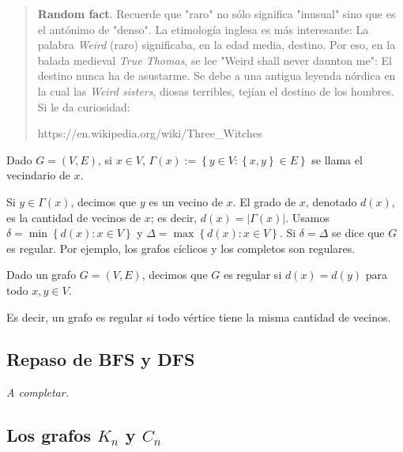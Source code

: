 \documentclass[a4paper]{article}
\begin{document}
\small
\begin{quote}

\textbf{Random fact}. Recuerde que "raro" no sólo significa "inusual" sino que es el
antónimo de "denso". La etimología inglesa es más interesante:
La palabra \textit{Weird} (raro) significaba, en la edad media, destino. Por
eso, en la balada medieval \textit{True Thomas}, se lee "Weird shall never
daunton me": El destino nunca ha de asustarme. Se debe a una antigua leyenda
nórdica en la cual las \textit{Weird sisters}, diosas terribles, tejían el
destino de los hombres. Si le da curiosidad:

https://en.wikipedia.org/wiki/Three_Witches

\end{quote}
\normalsize

\begin{definition}
    Dado $G = (V, E) $, si $x \in V$, $\Gamma(x) := \left\{ y \in V : \left\{ x,
        y\right\}  \in E
\right\} $ se llama el vecindario de $x$. 
\end{definition}

Si $y \in \Gamma(x)$, decimos que $y$
es un vecino de $x$.  El grado de $x$, denotado $d(x)$, es la cantidad de
vecinos de $x$; es decir, $d(x) = |\Gamma(x)|$.
Usamos $\delta = \min \left\{ d(x) : x \in V \right\} $ y $\Delta = \max \left\{
d(x) : x \in V\right\} $. Si $\delta = \Delta$ se dice que $G$ es regular. Por
ejemplo, los
grafos cíclicos y los completos son regulares.

\begin{definition}
    Dado un grafo $G = (V, E) $, decimos que $G$ es regular si $d(x) = d(y)$
    para todo $x, y \in V$.
\end{definition}

Es decir, un grafo es regular si todo vértice tiene la misma cantidad de
vecinos.



\subsection{Repaso de BFS y DFS}

\textit{A completar.}






\subsection{Los grafos $K_n$ y $C_n$}
\label{famosos}
\end{document}

